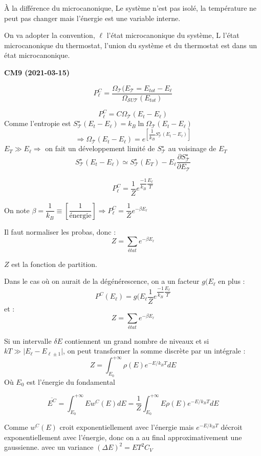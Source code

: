 \documentclass[12pt,a4paper]{report}
\begin{document}
À la différence du microcanonique, Le système n'est pas isolé, la température ne peut pas changer mais l'énergie est une variable interne.

On va adopter la convention, $\ell$ l'état microcanonique du système, L l'état microcanonique du thermostat, l'union du système et du thermostat est dans un état microcanonique.

\begin{center}
\textbf{CM9 (2021-03-15)}
\end{center}

\[
	P_\ell^C = \dfrac{\Omega_\mathcal{T} (E_\mathcal{T} = E_{tot} - E_\ell}{\Omega_{\mathcal{S} U \mathcal{T}}(E_{tot})}
\]

\[
	P_\ell^{C} = C \Omega_\mathcal{T} (E_t - E_\ell)
\]
Comme l'entropie est \(S_\mathcal{T}^\star (E_t - E_\ell) = k_B \ln \Omega_\mathcal{T} (E_t - E_\ell)\)
\[
	\Rightarrow \Omega_\mathcal{T} (E_t - E_\ell) = e^{\left[ \dfrac{1}{k_B} S_\mathcal{T}^\star (E_t - E_\ell) \right]}
\]
\(E_T \gg E_\ell \Rightarrow \) on fait un développement limité de \( S_\mathcal{T}^\star\) au voisinage de \(E_T\)
\[
	S_\mathcal{T}^\star (E_t - E_\ell) \simeq S_\mathcal{T}^\star (E_T) - E_\ell \dfrac{\partial S_\mathcal{T}^\star}{\partial E_\mathcal{T}}
\]

\[
	P_\ell^C = \dfrac{1}{Z} e^{\dfrac{-1}{k_B} \dfrac{E_\ell}{T}}
\]

On note \(\beta = \dfrac{1}{k_B} \equiv \left[ \dfrac{1}{\text{énergie}}\right] \Rightarrow P_\ell^{C} = \dfrac{1}{Z} e^{-\beta E_\ell}\)

Il faut normaliser les probas, donc :
\[
	Z = \sum_{état} e^{-\beta E_\ell}
\]

\(Z\) est la fonction de partition.

Dans le cas où on aurait de la dégénérescence, on a un facteur \(g(E_\ell\) en plus :
\[
	P^C (E_\ell) = g(E_\ell \dfrac{1}{Z} e^{\dfrac{-1}{k_B} \dfrac{E_\ell}{T}}
\]
et :
\[
	Z = \sum_{état} e^{-\beta E_\ell}
\]

Si un intervalle \(\delta E\) contiennent un grand nombre de niveaux et si \(kT \gg \vert E_\ell - E_{\ell \pm 1} \vert\), on peut transformer la somme discrète par un intégrale :
\[
	Z = \int_{E_0}^{+\infty} \rho(E) e^{-E/k_BT}dE
\]
Où \(E_0\) est l'énergie du fondamental

\[
	\overline{E^C} = \int_{E_0}^{+\infty} E w^C(E) dE = \dfrac{1}{Z} \int_{E_0}^{+\infty} E \rho(E) e^{-E/k_BT}dE
\]

Comme \(w^C(E)\) croit exponentiellement avec l'énergie mais \(e^{-E/k_BT}\) décroit exponentiellement avec l'énergie, donc on a au final approximativement une gaussienne. avec un variance \((\Delta E)^2 = ET^2 C_V\)
\end{document}
